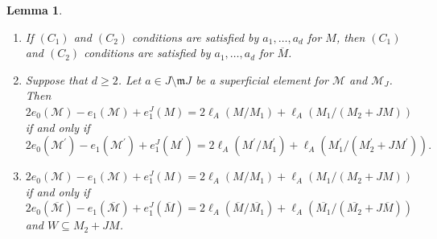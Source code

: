 \documentclass[11pt,reqno]{amsart}
\newtheorem{lemma}[theorem]{Lemma}
\theoremstyle{definition}
\newcommand{\m}{\mathfrak m}
\def\M{{\mathcal M}}
\numberwithin{equation}{section}
\begin{document}
\begin{lemma}\label{lemma-reduction-steps}
	\begin{enumerate}[label=(\roman*)]
		\item  If $(C_1)$ and $(C_2)$ conditions are satisfied by $a_1,\ldots,a_d$ for $M$, then $(C_1)$ and $(C_2)$ conditions are satisfied by $a_1,\ldots,a_d$ for $\overline{M}$. 
		
		\item \label{lemma-4.1} Suppose that $d\geq 2$. Let $a\in J\setminus \m J$ be a superficial element for $\M$ and $\M_J$.  Then  $2e_0(\M)-e_1(\M)+e_1^J(M)=2\ell_A(M/M_1)+\ell_A(M_1/(M_2+JM))$ if and only if
		$2e_0(\M^\prime)-e_1(\M^\prime)+e_1^J(M^\prime)=2\ell_{A}(M^\prime/{M}^\prime_1)+\ell_{A}({M}^\prime_1/({M}^\prime_2+JM^\prime)).$
		
		\item \label{lemma-4.2} $2e_0(\M)-e_1(\M)+e_1^J(M)=2\ell_A(M/M_1)+\ell_A(M_1/(M_2+JM))$ if and only if  
		$2e_0(\overline{\M})-e_1(\overline{\M})+e_1^J(\overline{M})=2\ell_A(\overline{M}/\overline{M_1} )+\ell_A(\overline{M_1} /(\overline{M_2} +J\overline{M}))$ and $W\subseteq M_2+JM$.
	\end{enumerate}
\end{lemma}
\end{document}
